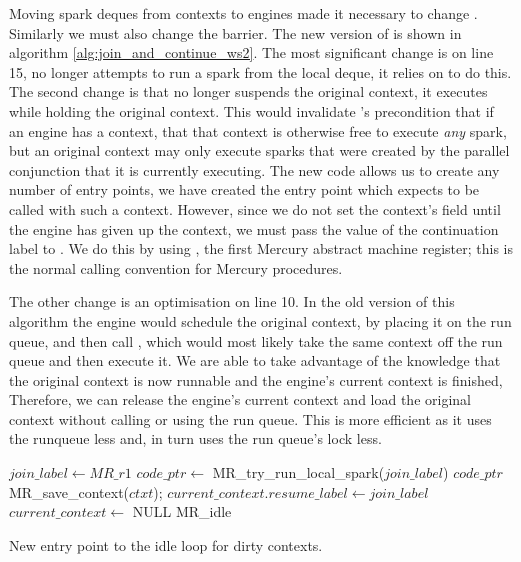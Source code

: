Moving spark deques from contexts to engines made it necessary to change
\idle.
Similarly we must also change the \joinandcontinue barrier.
The new version of \joinandcontinue is shown in algorithm
\ref{alg:join_and_continue_ws2}.
The most significant change is on line 15,
\joinandcontinue no longer attempts to run a spark from the local deque,
it relies on \idle to do this.
The second change is that \joinandcontinue no longer suspends the original
context, it executes \idle while holding the original context.
This would invalidate \idle's precondition that if an engine has a context,
that that context is otherwise free to execute \emph{any} spark,
but an original context may only execute sparks that were created by the
parallel conjunction that it is currently executing.
The new \idle code allows us to create any number of entry points,
we have created the \idleorigcontext entry point which expects to be called
with such a context.
However, since we do not set the context's  field until
the engine has given up the context,
we must pass the value of the continuation label to \idleorigcontext.
We do this by using , the first Mercury abstract machine
register;
this is the normal calling convention for Mercury procedures.

The other change is an optimisation on line 10.
In the old version of this algorithm the engine would schedule the original
context,
by placing it on the run queue,
and then call \idle,
which would most likely take the same context off the run queue and then
execute it.
We are able to take advantage of the knowledge that the original context is
now runnable and the engine's current context is finished,
Therefore, we can release the engine's current context and load the original
context without calling \idle or using the run queue.
This is more efficient as it uses the runqueue less and,
in turn uses the run queue's lock less.

\begin{algorithm}[tbp]
\begin{algorithmic}
        \State $join\_label \gets MR\_r1$
        \State $code\_ptr \gets$ MR\_try\_run\_local\_spark($join\_label$)
            \Goto $code\_ptr$
        \EndIf
        \State MR\_save\_context($ctxt$);
        \State $current\_context.resume\_label \gets join\_label$
        \State $current\_context \gets$ NULL
        \Goto MR\_idle
    \EndProcedure
\end{algorithmic}
\caption{New entry point to the idle loop for dirty contexts.}
\label{alg:idle_orig_context}
\end{algorithm}

